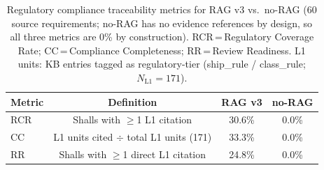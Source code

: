 \begin{table}[H]
\caption{Regulatory compliance traceability metrics for RAG v3 vs.\ no-RAG (60 source requirements; no-RAG has no evidence references by design, so all three metrics are 0\% by construction). RCR\,=\,Regulatory Coverage Rate; CC\,=\,Compliance Completeness; RR\,=\,Review Readiness. L1 units: KB entries tagged as regulatory-tier (ship\_rule / class\_rule; $N_{\mathrm{L1}}=171$).}
\label{tab:compliance}
\begin{tabular}{lccc}
\toprule
\textbf{Metric} & \textbf{Definition} & \textbf{RAG v3} & \textbf{no-RAG} \\
\midrule
RCR & Shalls with $\geq$1 L1 citation & 30.6\% & 0.0\% \\
CC  & L1 units cited $\div$ total L1 units (171) & 33.3\% & 0.0\% \\
RR  & Shalls with $\geq$1 direct L1 citation & 24.8\% & 0.0\% \\
\bottomrule
\end{tabular}
\end{table}